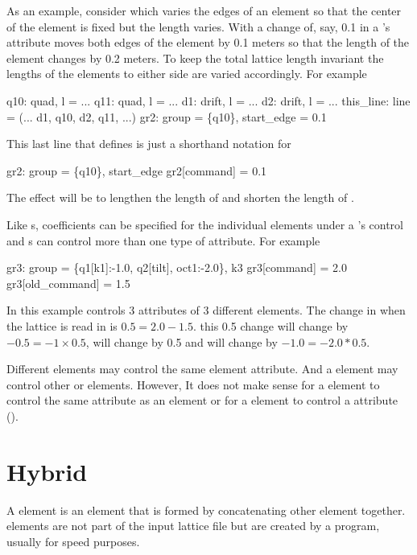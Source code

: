 As an example, consider  which varies the edges of
an element so that the center of the element is fixed but the length
varies. With  a change of, say, 0.1 in a
's  attribute moves both edges of the element by
0.1 meters so that the length of the element changes by 0.2 meters. To
keep the total lattice length invariant the lengths of the elements to
either side are varied accordingly. For example
\begin{example}
  q10: quad, l = ...
  q11: quad, l = ...
  d1: drift, l = ...
  d2: drift, l = ...
  this_line: line = (... d1, q10, d2, q11, ...)
  gr2: group = \{q10\}, start_edge = 0.1
\end{example}
This last line that defines  is just a shorthand notation for
\begin{example}
  gr2: group = \{q10\}, start_edge 
  gr2[command] = 0.1
\end{example}
The effect will be to lengthen the length of  and shorten the
length of .

Like s, coefficients can be specified for the individual
elements under a 's control and s can control more
than one type of attribute. For example
\begin{example}
  gr3: group = \{q1[k1]:-1.0, q2[tilt], oct1:-2.0\}, k3
  gr3[command] = 2.0
  gr3[old_command] = 1.5
\end{example}
In this example  controls 3 attributes of 3 different
elements. The change in  when the lattice is read in is $0.5
= 2.0 - 1.5$. this 0.5 change will change  by $-0.5 = -1
\times 0.5$,  will change by 0.5 and  will
change by $-1.0 = -2.0 * 0.5$.

Different  elements may control the same element
attribute. And a  element may control other 
 or  elements. However, It does not make sense
for a  element to control the same attribute as an
 element or for a  element to control a
 attribute ().

\section{Hybrid}
\label{s:hybrid}

A  element is an element that is formed by concatenating
other element together.  elements are not part of the input
lattice file but are created by a program, usually for speed purposes.

